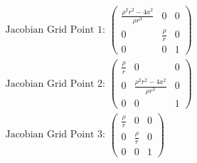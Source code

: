 \documentclass{article}
\begin{document}
\begin{align*}
	\text{Jacobian Grid Point 1: } \begin{pmatrix}
		\frac{\rho^{2}r^{2}-4a^{2}}{\rho r^{3}} & 0 & 0 \\
		0 & \frac{\rho}{r} & 0 \\
		0 & 0 & 1
	\end{pmatrix} \\
	\text{Jacobian Grid Point 2: } \begin{pmatrix}
		\frac{\rho}{r} & 0 & 0 \\
		0 & \frac{\rho^{2}r^{2}-4a^{2}}{\rho r^{3}} & 0 \\
		0 & 0 & 1
	\end{pmatrix} \\
	\text{Jacobian Grid Point 3: } \begin{pmatrix}
		\frac{\rho}{r} & 0 & 0 \\
		0 & \frac{\rho}{r} & 0 \\
		0 & 0 & 1
	\end{pmatrix}
\end{align*}
\end{document}
